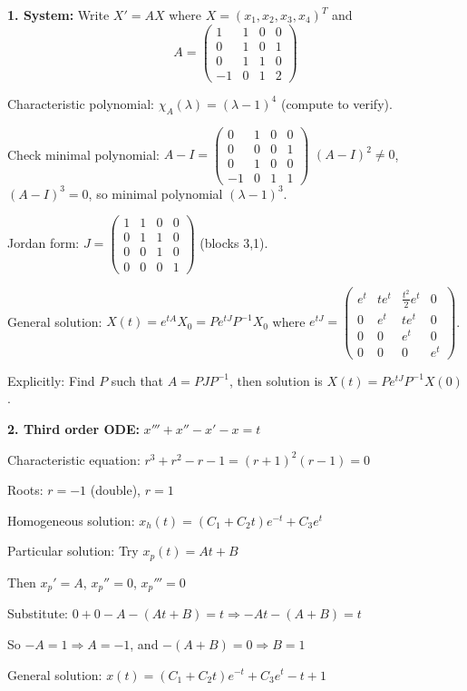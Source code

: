 \documentclass[12pt]{article}
\begin{document}
\begin{correctionbox}
\textbf{1. System:} Write $X' = AX$ where $X = (x_1,x_2,x_3,x_4)^T$ and
\[
A = \begin{pmatrix} 1 & 1 & 0 & 0 \\ 0 & 1 & 0 & 1 \\ 0 & 1 & 1 & 0 \\ -1 & 0 & 1 & 2 \end{pmatrix}
\]

Characteristic polynomial: $\chi_A(\lambda) = (\lambda-1)^4$ (compute to verify).

Check minimal polynomial: $A-I = \begin{pmatrix} 0 & 1 & 0 & 0 \\ 0 & 0 & 0 & 1 \\ 0 & 1 & 0 & 0 \\ -1 & 0 & 1 & 1 \end{pmatrix}$
$(A-I)^2 \neq 0$, $(A-I)^3 = 0$, so minimal polynomial $(\lambda-1)^3$.

Jordan form: $J = \begin{pmatrix} 1 & 1 & 0 & 0 \\ 0 & 1 & 1 & 0 \\ 0 & 0 & 1 & 0 \\ 0 & 0 & 0 & 1 \end{pmatrix}$ (blocks 3,1).

General solution: $X(t) = e^{tA}X_0 = Pe^{tJ}P^{-1}X_0$ where $e^{tJ} = \begin{pmatrix} e^t & te^t & \frac{t^2}{2}e^t & 0 \\ 0 & e^t & te^t & 0 \\ 0 & 0 & e^t & 0 \\ 0 & 0 & 0 & e^t \end{pmatrix}$.

Explicitly: Find $P$ such that $A = PJP^{-1}$, then solution is $X(t) = P e^{tJ} P^{-1} X(0)$.

\textbf{2. Third order ODE:} $x''' + x'' - x' - x = t$

Characteristic equation: $r^3 + r^2 - r - 1 = (r+1)^2(r-1) = 0$

Roots: $r = -1$ (double), $r = 1$

Homogeneous solution: $x_h(t) = (C_1 + C_2 t)e^{-t} + C_3 e^t$

Particular solution: Try $x_p(t) = At + B$

Then $x_p' = A$, $x_p'' = 0$, $x_p''' = 0$

Substitute: $0 + 0 - A - (At+B) = t \Rightarrow -At - (A+B) = t$

So $-A = 1 \Rightarrow A = -1$, and $-(A+B) = 0 \Rightarrow B = 1$

General solution: $x(t) = (C_1 + C_2 t)e^{-t} + C_3 e^t - t + 1$
\end{correctionbox}
\end{document}
